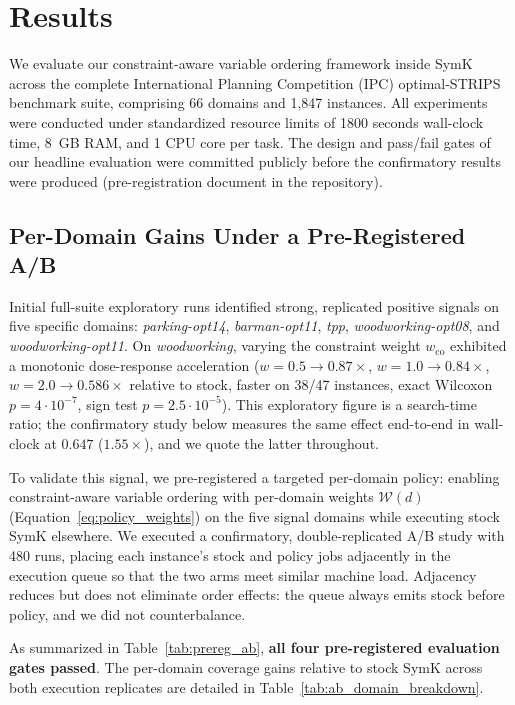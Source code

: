 \documentclass[twocolumn,10pt]{article}
\begin{document}
\section{Results} \label{sec:res}

We evaluate our constraint-aware variable ordering framework inside \textsf{SymK} across the complete International Planning Competition (IPC) optimal-STRIPS benchmark suite, comprising 66 domains and 1,847 instances. All experiments were conducted under standardized resource limits of 1800 seconds wall-clock time, 8\, GB RAM, and 1 CPU core per task. The design and pass/fail gates of our headline evaluation were committed publicly before the confirmatory results were produced (pre-registration document in the repository). 

\subsection{Per-Domain Gains Under a Pre-Registered A/B}
Initial full-suite exploratory runs identified strong, replicated positive signals on five specific domains: \textit{parking-opt14}, \textit{barman-opt11}, \textit{tpp}, \textit{woodworking-opt08}, and \textit{woodworking-opt11}. On \textit{woodworking}, varying the constraint weight $w_{\text{co}}$ exhibited a monotonic dose-response acceleration ($w=0.5 \to 0.87\times$, $w=1.0 \to 0.84\times$, $w=2.0 \to \mathbf{0.586\times}$ relative to stock, faster on 38/47 instances, exact Wilcoxon $p = 4 \cdot 10^{-7}$, sign test $p = 2.5 \cdot 10^{-5}$). This exploratory figure is a search-time ratio; the confirmatory study below measures the same effect end-to-end in wall-clock at $0.647$ ($1.55\times$), and we quote the latter throughout.

To validate this signal, we pre-registered a targeted per-domain policy: enabling constraint-aware variable ordering with per-domain weights $\mathcal{W}(d)$ (Equation~\ref{eq:policy_weights}) on the five signal domains while executing stock \textsf{SymK} elsewhere. We executed a confirmatory, double-replicated A/B study with 480 runs, placing each instance's stock and policy jobs adjacently in the execution queue so that the two arms meet similar machine load. Adjacency reduces but does not eliminate order effects: the queue always emits stock before policy, and we did not counterbalance.

As summarized in Table~\ref{tab:prereg_ab}, \textbf{all four pre-registered evaluation gates passed}. The per-domain coverage gains relative to stock \textsf{SymK} across both execution replicates are detailed in Table~\ref{tab:ab_domain_breakdown}.
\end{document}

